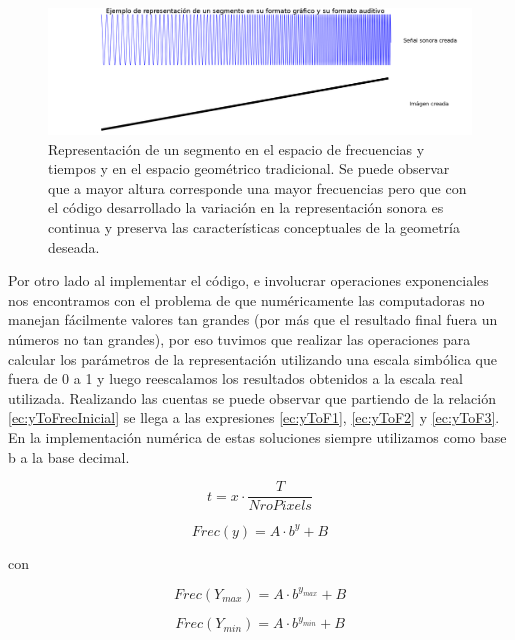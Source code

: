 \documentclass{article}
\begin{document}
    \begin{figure}
        \center
        \includegraphics[width=\textwidth]{Imagenes/rampaFrec.png}
        \caption{Representación de un segmento en el espacio de frecuencias y tiempos y en el espacio geométrico tradicional. Se puede observar que a mayor altura corresponde una mayor frecuencias pero que con el código desarrollado la variación en la representación sonora es continua y preserva las características conceptuales de la geometría deseada.}
        \label{fig:rampaFrec}
    \end{figure}
    
    Por otro lado al implementar el código, e involucrar operaciones exponenciales nos encontramos con el problema de que numéricamente las computadoras no manejan fácilmente valores tan grandes (por más que el resultado final fuera un números no tan grandes), por eso tuvimos que realizar las operaciones para calcular los parámetros de la representación utilizando una escala simbólica que fuera de 0 a 1 y luego reescalamos los resultados obtenidos a la escala real utilizada. Realizando las cuentas se puede observar que partiendo de la relación \ref{ec:yToFrecInicial} se llega a las expresiones  \ref{ec:yToF1}, \ref{ec:yToF2} y \ref{ec:yToF3}. En la implementación numérica de estas soluciones siempre utilizamos como base b a la base decimal.
    
    \begin{equation}
        \label{ec:xTot}
        t = x \cdot \frac{T}{NroPixels}
    \end{equation}
    
    \begin{equation}
        \label{ec:yToFrecInicial}
        Frec(y) = A \cdot b^{y} + B
    \end{equation}
    
    con 
    
    \begin{equation*}
        Frec(Y_{max}) = A \cdot b^{y_{max}} + B
    \end{equation*}
    
    \begin{equation*}
        Frec(Y_{min}) = A \cdot b^{y_{min}} + B
    \end{equation*}
    
\end{document}
